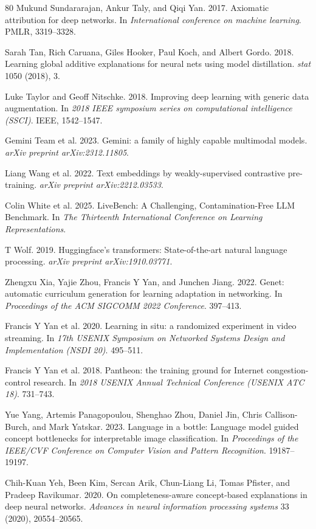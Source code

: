 \documentclass[11pt,a4paper]{article}
\begin{document}
\begin{thebibliography}{80}
 Mukund Sundararajan, Ankur Taly, and Qiqi Yan. 2017. Axiomatic attribution for deep networks. In \emph{International conference on machine learning}. PMLR, 3319--3328.

 Sarah Tan, Rich Caruana, Giles Hooker, Paul Koch, and Albert Gordo. 2018. Learning global additive explanations for neural nets using model distillation. \emph{stat} 1050 (2018), 3.

 Luke Taylor and Geoff Nitschke. 2018. Improving deep learning with generic data augmentation. In \emph{2018 IEEE symposium series on computational intelligence (SSCI)}. IEEE, 1542--1547.

 Gemini Team et al. 2023. Gemini: a family of highly capable multimodal models. \emph{arXiv preprint arXiv:2312.11805}.

 Liang Wang et al. 2022. Text embeddings by weakly-supervised contrastive pre-training. \emph{arXiv preprint arXiv:2212.03533}.

 Colin White et al. 2025. LiveBench: A Challenging, Contamination-Free LLM Benchmark. In \emph{The Thirteenth International Conference on Learning Representations}.

 T Wolf. 2019. Huggingface's transformers: State-of-the-art natural language processing. \emph{arXiv preprint arXiv:1910.03771}.

 Zhengxu Xia, Yajie Zhou, Francis Y Yan, and Junchen Jiang. 2022. Genet: automatic curriculum generation for learning adaptation in networking. In \emph{Proceedings of the ACM SIGCOMM 2022 Conference}. 397--413.

 Francis Y Yan et al. 2020. Learning in situ: a randomized experiment in video streaming. In \emph{17th USENIX Symposium on Networked Systems Design and Implementation (NSDI 20)}. 495--511.

 Francis Y Yan et al. 2018. Pantheon: the training ground for Internet congestion-control research. In \emph{2018 USENIX Annual Technical Conference (USENIX ATC 18)}. 731--743.

 Yue Yang, Artemis Panagopoulou, Shenghao Zhou, Daniel Jin, Chris Callison-Burch, and Mark Yatskar. 2023. Language in a bottle: Language model guided concept bottlenecks for interpretable image classification. In \emph{Proceedings of the IEEE/CVF Conference on Computer Vision and Pattern Recognition}. 19187--19197.

 Chih-Kuan Yeh, Been Kim, Sercan Arik, Chun-Liang Li, Tomas Pfister, and Pradeep Ravikumar. 2020. On completeness-aware concept-based explanations in deep neural networks. \emph{Advances in neural information processing systems} 33 (2020), 20554--20565.


\end{thebibliography}
\end{document}
